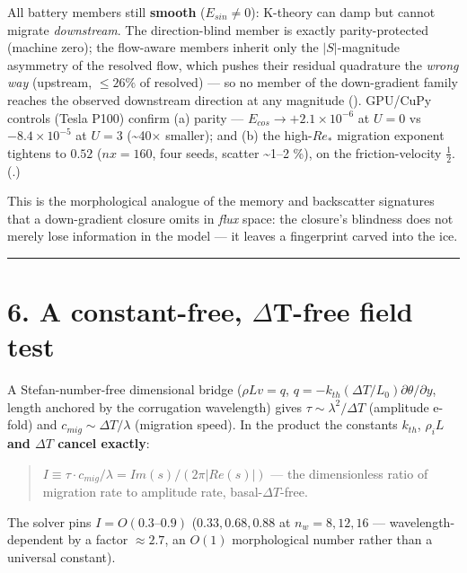 \documentclass[11pt]{article}
\begin{document}
All battery members still \textbf{smooth} ($E_{sin}\ne 0$): K-theory can damp but cannot migrate \emph{downstream}. The direction-blind member is exactly parity-protected (machine zero); the flow-aware members inherit only the $|S|$-magnitude asymmetry of the resolved flow, which pushes their residual quadrature the \emph{wrong way} (upstream, $\le 26\%$ of resolved) — so no member of the down-gradient family reaches the observed downstream direction at any magnitude (). GPU/CuPy controls (Tesla P100) confirm (a) parity — $E_{cos}\to +2.1\times 10^{-6}$ at $U=0$ vs $-8.4\times 10^{-5}$ at $U=3$ (\textasciitilde{}40\ensuremath{\times} smaller); and (b) the high-$Re_*$ migration exponent tightens to \textbf{$0.52$} ($nx=160$, four seeds, scatter \textasciitilde{}1–2 \%), on the friction-velocity $\tfrac{1}{2}$. (.)


This is the morphological analogue of the memory and backscatter signatures that a down-gradient closure omits in \emph{flux} space: the closure's blindness does not merely lose information in the model — it leaves a fingerprint carved into the ice.


\medskip\hrule\medskip


\section*{6. A constant-free, \ensuremath{\Delta}T-free field test}


A Stefan-number-free dimensional bridge ($\rho L v = q$, $q=-k_{th}(\Delta T/L_{0})\partial \theta /\partial y$, length anchored by the corrugation wavelength) gives $\tau  \sim  \lambda ^{2}/\Delta T$ (amplitude e-fold) and $c_{mig} \sim  \Delta T/\lambda $ (migration speed). In the product the constants $k_{th}$, $\rho _{i}L$ \textbf{and $\Delta T$ cancel exactly}:


\begin{quote}
$I \equiv  \tau \cdot c_{mig}/\lambda  = Im(s)/(2\pi |Re(s)|)$ — the dimensionless ratio of migration rate to amplitude rate, basal-$\Delta T$-free.
\end{quote}


The solver pins $I=O(0.3–0.9)$ ($0.33, 0.68, 0.88$ at $n_{w}=8,12,16$ — wavelength-dependent by a factor $\approx 2.7$, an $O(1)$ morphological number rather than a universal constant).
\end{document}
